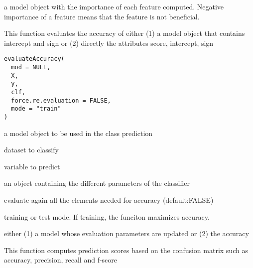 \documentclass[a4paper]{book}
\begin{document}
%
\begin{Value}
a model object with the importance of each feature computed. Negative importance of a feature means that the feature is not beneficial.
\end{Value}
%
\begin{Description}
This function evaluates the accuracy of either (1) a model object that contains intercept and sign or (2) directly the attributes score, intercept, sign
\end{Description}
%
\begin{Usage}
\begin{verbatim}
evaluateAccuracy(
  mod = NULL,
  X,
  y,
  clf,
  force.re.evaluation = FALSE,
  mode = "train"
)
\end{verbatim}
\end{Usage}
%
\begin{Arguments}
\begin{ldescription}
\item[\code{mod:}] a model object to be used in the class prediction

\item[\code{X:}] dataset to classify

\item[\code{y:}] variable to predict

\item[\code{clf:}] an object containing the different parameters of the classifier

\item[\code{force.re.evaluation:}] evaluate again all the elements needed for accuracy (default:FALSE)

\item[\code{mode:}] training or test mode. If training, the funciton maximizes accuracy.
\end{ldescription}
\end{Arguments}
%
\begin{Value}
either (1) a model whose evaluation parameters are updated or (2) the accuracy
\end{Value}
%
\begin{Description}
This function computes prediction scores based on the confusion matrix such as accuracy, precision, recall and f-score
\end{Description}
\end{document}
